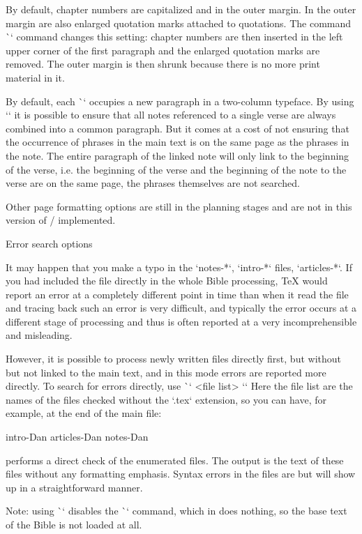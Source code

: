 {{{{By default, chapter numbers are capitalized and in the outer margin. In the outer margin are also
enlarged quotation marks attached to quotations. The command \`\normalchapnumbers`
command changes this setting: chapter numbers are then inserted in the left
upper corner of the first paragraph and the enlarged quotation marks are removed.
The outer margin is then shrunk because there is no more print material in it.  

By default, each \`\Note` occupies a new paragraph in a two-column
typeface. By using `\mergednotes` it is possible to ensure that all notes referenced
to a single verse are always combined into a common paragraph. But it comes at a cost
of not ensuring that the occurrence of phrases in the main text is on the same page
as the phrases in the note. The entire paragraph of the linked note will only link to
the beginning of the verse, i.e. the beginning of the verse and the beginning of the note to the verse are on the same
page, the phrases themselves are not searched.

Other page formatting options are still in the planning stages and are not in this version of \OpBible/
implemented.


\sec Error search options

It may happen that you make a typo in the `notes-*`, `intro-*` files,
`articles-*`. If you had included the file directly in the whole Bible processing,
TeX would report an error at a completely different point in time than when it read the file and
tracing back such an error is very difficult, and typically the error
occurs at a different stage of processing and thus is often reported at a very
incomprehensible and misleading.

However, it is possible to process newly written files directly first, but without
but not linked to the main text, and in this mode errors are reported more directly.
To search for errors directly, use \`\checksyntax` <file list> `{}`
Here the file list are the names of the files checked without the `.tex` extension,
so you can have, for example, at the end of the main file:

\begtt
\checksyntax intro-Dan articles-Dan notes-Dan {}
\endtt

performs a direct check of the enumerated files. The output is the text of these
files without any formatting emphasis. Syntax errors in the files are
but will show up in a straightforward manner.

Note: using \`\checksyntax` disables the \`\processbooks` command, which in
does nothing, so the base text of the Bible is not loaded at all.


}}}}
